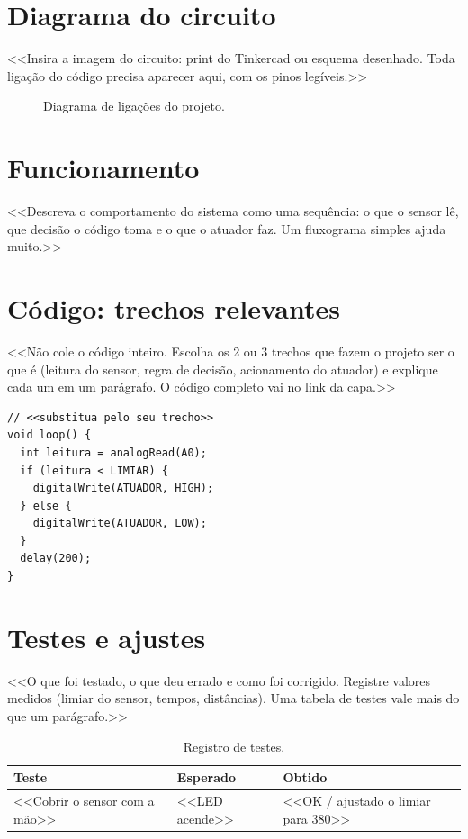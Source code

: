 \documentclass{abntex2}
\begin{document}
\section{Diagrama do circuito}
<<Insira a imagem do circuito: print do Tinkercad ou esquema desenhado. Toda ligação do
código precisa aparecer aqui, com os pinos legíveis.>>

\begin{figure}[H]
  \centering
  \caption{Diagrama de ligações do projeto.}
\end{figure}

\section{Funcionamento}
<<Descreva o comportamento do sistema como uma sequência: o que o sensor lê, que decisão
o código toma e o que o atuador faz. Um fluxograma simples ajuda muito.>>

\section{Código: trechos relevantes}
<<Não cole o código inteiro. Escolha os 2 ou 3 trechos que fazem o projeto ser o que é
(leitura do sensor, regra de decisão, acionamento do atuador) e explique cada um em
um parágrafo. O código completo vai no link da capa.>>

\begin{lstlisting}[caption={Leitura do sensor e decisão.}]
// <<substitua pelo seu trecho>>
void loop() {
  int leitura = analogRead(A0);
  if (leitura < LIMIAR) {
    digitalWrite(ATUADOR, HIGH);
  } else {
    digitalWrite(ATUADOR, LOW);
  }
  delay(200);
}
\end{lstlisting}

\section{Testes e ajustes}
<<O que foi testado, o que deu errado e como foi corrigido. Registre valores medidos
(limiar do sensor, tempos, distâncias). Uma tabela de testes vale mais do que um parágrafo.>>

\begin{table}[H]
  \centering
  \begin{tabular}{lll}
    \toprule
    \textbf{Teste} & \textbf{Esperado} & \textbf{Obtido} \\
    \midrule
    <<Cobrir o sensor com a mão>> & <<LED acende>> & <<OK / ajustado o limiar para 380>> \\
    \bottomrule
  \end{tabular}
  \caption{Registro de testes.}
\end{table}
\end{document}
